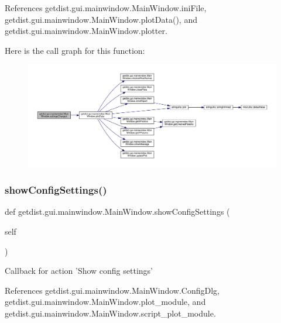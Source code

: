 References getdist.\+gui.\+mainwindow.\+Main\+Window.\+ini\+File, getdist.\+gui.\+mainwindow.\+Main\+Window.\+plot\+Data(), and getdist.\+gui.\+mainwindow.\+Main\+Window.\+plotter.

Here is the call graph for this function\+:
\nopagebreak
\begin{figure}[H]
\begin{center}
\leavevmode
\includegraphics[width=350pt]{classgetdist_1_1gui_1_1mainwindow_1_1MainWindow_ac0c692080d7ff6956628ce458bea4c6b_cgraph}
\end{center}
\end{figure}
\mbox{\label{classgetdist_1_1gui_1_1mainwindow_1_1MainWindow_a27ed85036d6f1e23f974058c03a687e9}} 
\subsubsection{\texorpdfstring{show\+Config\+Settings()}{showConfigSettings()}}
{\footnotesize\ttfamily def getdist.\+gui.\+mainwindow.\+Main\+Window.\+show\+Config\+Settings (\begin{DoxyParamCaption}\item[{}]{self }\end{DoxyParamCaption})}

\begin{DoxyVerb}Callback for action 'Show config settings'
\end{DoxyVerb}
 

References getdist.\+gui.\+mainwindow.\+Main\+Window.\+Config\+Dlg, getdist.\+gui.\+mainwindow.\+Main\+Window.\+plot\+\_\+module, and getdist.\+gui.\+mainwindow.\+Main\+Window.\+script\+\_\+plot\+\_\+module.

